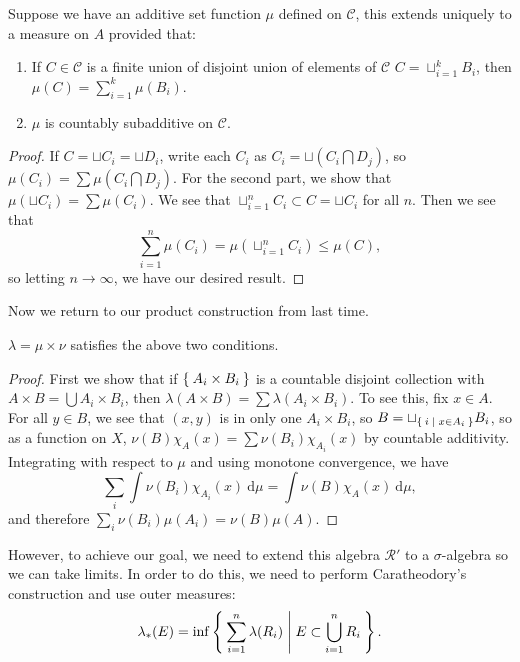 \documentclass[10pt, twoside]{article}
\renewcommand{\d}{\ \mathrm{d}}
\begin{document}
    \begin{lem}
        Suppose we have an additive set function $\mu$ defined on $\mathcal{C}$, this extends uniquely to a measure on $A$ provided that:

    \begin{enumerate}
        \item If $C \in \mathcal{C}$ is a finite union of disjoint union of elements of $\mathcal{C}$ $C = \sqcup_{i=1}^k B_i$, then $\mu(C) = \sum_{i=1}^k \mu(B_i)$.
        \item $\mu$ is countably subadditive on $\mathcal{C}$.
    \end{enumerate}
    \begin{proof}
        If $C = \sqcup C_i = \sqcup D_i$, write each $C_i$ as $C_i = \sqcup (C_i \bigcap D_j)$, so $\mu(C_i) = \sum \mu(C_i \bigcap D_j)$. For the second part, we show that $\mu(\sqcup C_i) = \sum \mu(C_i)$. We see that $\sqcup_{i=1}^n C_i \subset C = \sqcup C_i$ for all $n$. Then we see that \[\sum_{i=1}^n \mu(C_i) = \mu(\sqcup_{i=1}^n C_i) \leq \mu(C),\] so letting $n \rightarrow \infty$, we have our desired result.
    \end{proof}
    \end{lem}

    Now we return to our product construction from last time. 

    \begin{lem}
        $\lambda = \mu \times \nu$ satisfies the above two conditions.
        \begin{proof}
            First we show that if $\Set{A_i \times B_i}$ is a countable disjoint collection with $A \times B = \bigcup A_i \times B_i$, then $\lambda(A \times B) = \sum \lambda(A_i \times B_i)$. To see this, fix $x \in A$. For all $y \in B$, we see that $(x,y)$ is in only one $A_i \times B_i$, so $B = \sqcup_{\Set{i | x \in A_i}} B_i$, so as a function on $X$, $\nu(B)\chi_A(x) = \sum \nu(B_i) \chi_{A_i}(x)$ by countable additivity. Integrating with respect to $\mu$ and using monotone convergence, we have \[ \sum_i \int \nu(B_i)\chi_{A_i}(x)\d \mu = \int \nu(B) \chi_A(x) \d \mu, \] and therefore $\sum_i \nu(B_i)\mu(A_i) = \nu(B)\mu(A)$.
        \end{proof}
    \end{lem}

    However, to achieve our goal, we need to extend this algebra $\mathcal{R'}$ to a $\sigma$-algebra so we can take limits. In order to do this, we need to perform Caratheodory's construction and use outer measures:  \[ \lambda_*(E) = \inf \Set{\sum_{i=1}^n \lambda(R_i) | E \subset \bigcup_{i=1}^n R_i}. \]
\end{document}
